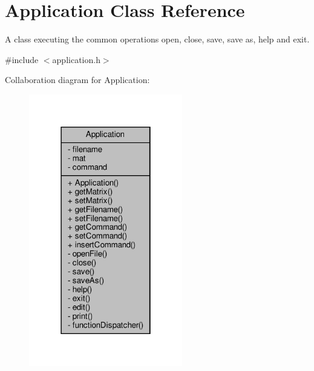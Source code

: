 \hypertarget{class_application}{}\section{Application Class Reference}
\label{class_application}


A class executing the common operations open, close, save, save as, help and exit.  




{\ttfamily \#include $<$application.\+h$>$}



Collaboration diagram for Application\+:\nopagebreak
\begin{figure}[H]
\begin{center}
\leavevmode
\includegraphics[width=190pt]{class_application__coll__graph}
\end{center}
\end{figure}
